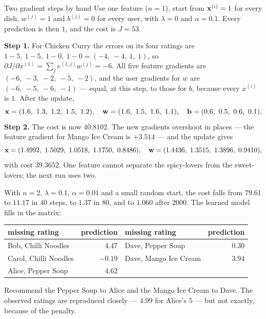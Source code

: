 \begin{workedexample}{Two gradient steps by hand}
Use one feature ($n = 1$), start from $\mathbf{x}^{(i)} = 1$ for every dish,
$w^{(j)} = 1$ and $b^{(j)} = 0$ for every user, with $\lambda = 0$ and
$\alpha = 0.1$. Every prediction is then $1$, and the cost is $J = 53$.

\textbf{Step 1.} For Chicken Curry the errors on its four ratings are
$1-5,\ 1-5,\ 1-0,\ 1-0 = (-4,\ -4,\ 1,\ 1)$, so
$\partial J/\partial x^{(1)} = \sum_j e^{(1,j)}w^{(j)} = -6$. All five feature
gradients are $(-6,\ -3,\ -2,\ -5,\ -2)$, and the user gradients for $w$ are
$(-6,\ -5,\ -6,\ -1)$ --- equal, at this step, to those for $b$, because every
$x^{(i)}$ is $1$. After the update,
\[
  \vx = (1.6,\ 1.3,\ 1.2,\ 1.5,\ 1.2),\quad
  \vw = (1.6,\ 1.5,\ 1.6,\ 1.1),\quad
  \mathbf{b} = (0.6,\ 0.5,\ 0.6,\ 0.1).
\]
\textbf{Step 2.} The cost is now $40.8102$. The new gradients overshoot in places
--- the feature gradient for Mango Ice Cream is $+3.514$ --- and the update gives
\[
  \vx = (1.4992,\ 1.5029,\ 1.0518,\ 1.1750,\ 0.8486),\quad
  \vw = (1.4436,\ 1.3515,\ 1.3896,\ 0.9410),
\]
with cost $39.3652$. One feature cannot separate the spicy-lovers from the
sweet-lovers; the next run uses two.
\end{workedexample}

With $n = 2$, $\lambda = 0.1$, $\alpha = 0.01$ and a small random start, the
cost falls from $79.61$ to $11.17$ in $40$ steps, to $1.37$ in $80$, and to
$1.060$ after $2000$. The learned model fills in the matrix:

\begin{center}
\small
\renewcommand{\arraystretch}{1.15}
\begin{tabular}{@{}lr@{\qquad}lr@{}}
\toprule
missing rating & prediction & missing rating & prediction\\
\midrule
Bob, Chilli Noodles   & $4.47$  & Dave, Pepper Soup     & $0.30$\\
Carol, Chilli Noodles & $-0.19$ & Dave, Mango Ice Cream & $3.94$\\
Alice, Pepper Soup    & $4.62$  &                       & \\
\bottomrule
\end{tabular}
\end{center}

Recommend the Pepper Soup to Alice and the Mango Ice Cream to Dave. The observed
ratings are reproduced closely --- $4.99$ for Alice's $5$ --- but not exactly,
because of the penalty.

